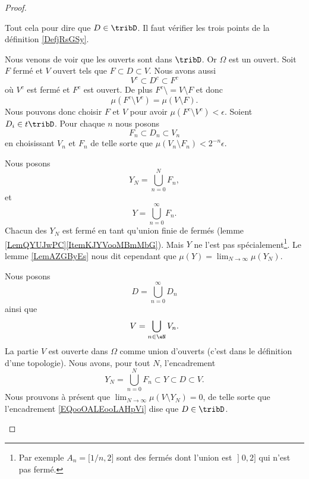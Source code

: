 \begin{proof}
\begin{subproof}
		Tout cela pour dire que \( D\in\tribD\).
		Il faut vérifier les trois points de la définition \ref{DefjRsGSy}.
		\begin{subproof}
			\spitem[\( \Omega\in\tribD\)]
			Nous venons de voir que les ouverts sont dans \( \tribD\). Or \( \Omega\) est un ouvert.
			Soit \( F\) fermé et \( V\) ouvert tels que \( F\subset D\subset V\). Nous avons aussi
			\begin{equation}
				V^c\subset D^c\subset F^c
			\end{equation}
			où \( V^c\) est fermé et \( F^c\) est ouvert. De plus \( F^c\setminus = V\setminus F\) et donc
			\begin{equation}
				\mu(F^c\setminus V^c)=\mu(V\setminus F).
			\end{equation}
			Nous pouvons donc choisir \( F\) et \( V\) pour avoir \( \mu(F^c\setminus V^c)<\epsilon\).
			Soient \( D_i\in t\tribD\). Pour chaque \( n\) nous posons
			\begin{equation}
				F_n\subset D_n\subset V_n
			\end{equation}
			en choisissant \( V_n\) et \( F_n\) de telle sorte que \( \mu(V_n\setminus F_n)<2^{-n}\epsilon\).

			Nous posons
			\begin{equation}
				Y_N=\bigcup_{n=0}^NF_n,
			\end{equation}
			et
			\begin{equation}
				Y=\bigcup_{n=0}^{\infty}F_n.
			\end{equation}
			Chacun des \( Y_N\) est fermé en tant qu'union finie de fermés (lemme \ref{LemQYUJwPC}\ref{ItemKJYVooMBmMbG}). Mais \( Y\) ne l'est pas spécialement\footnote{Par exemple \( A_n=\mathopen[ 1/n , 2 \mathclose]\) sont des fermés dont l'union est \( \mathopen] 0 , 2 \mathclose]\) qui n'est pas fermé.}. Le lemme \ref{LemAZGByEs} nous dit cependant que \( \mu(Y)=\lim_{N\to \infty} \mu(Y_N)\).

			Nous posons
			\begin{equation}
				D=\bigcup_{n=0}^{\infty}D_n
			\end{equation}
			ainsi que
			\begin{equation}
				V=\bigcup_{n\in \eN} V_n.
			\end{equation}
			La partie \( V\) est ouverte dans \( \Omega\) comme union d'ouverts (c'est dans le définition d'une topologie). Nous avons, pour tout \( N\), l'encadrement
			\begin{equation}        \label{EQooOALEooLAHpVi}
				Y_N=\bigcup_{n=0}^NF_n\subset Y\subset D\subset V.
			\end{equation}
			Nous prouvons à présent que \( \lim_{N\to \infty} \mu(V\setminus Y_N)=0\), de telle sorte que l'encadrement \eqref{EQooOALEooLAHpVi} dise que \( D\in\tribD\).


\end{subproof}
\end{subproof}
\end{proof}
